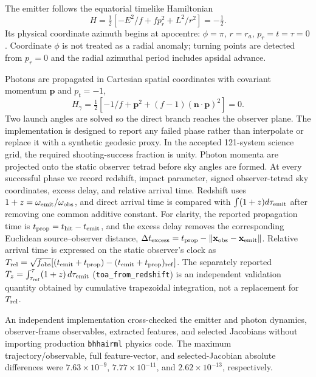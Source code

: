 \documentclass[11pt]{article}
\begin{document}
The emitter follows the equatorial timelike Hamiltonian
\begin{equation}
 H=\tfrac12[-E^2/f+fp_r^2+L^2/r^2]=-\tfrac12.
\end{equation}
Its physical coordinate azimuth begins at apocentre:
$\phi=\pi$, $r=r_a$, $p_r=t=\tau=0$. Coordinate $\phi$ is not treated as a
radial anomaly; turning points are detected from $p_r=0$ and the radial
azimuthal period includes apsidal advance.

Photons are propagated in Cartesian spatial coordinates with covariant momentum
$\mathbf p$ and $p_t=-1$,
\begin{equation}
 H_\gamma=\tfrac12[-1/f+\mathbf p^2+(f-1)(\mathbf n\!\cdot\!\mathbf p)^2]=0.
\end{equation}
Two launch angles are solved so the direct branch reaches the observer plane.
The implementation is designed to report any failed phase rather than
interpolate or replace it with a synthetic geodesic proxy. In the accepted
121-system science grid, the required shooting-success fraction is unity.
Photon momenta are projected onto the
static observer tetrad before sky angles are formed. At every successful phase
we record redshift, impact parameter, signed
observer-tetrad sky coordinates, excess delay, and relative arrival time.
Redshift uses
$1+z=\omega_{\rm emit}/\omega_{\rm obs}$, and direct arrival time is compared
with $\int(1+z)d\tau_{\rm emit}$ after removing one common additive constant.
For clarity, the reported propagation time is
$t_{\rm prop}=t_{\rm hit}-t_{\rm emit}$, and the excess delay removes the
corresponding Euclidean source--observer distance,
$\Delta t_{\rm excess}=t_{\rm prop}-\lVert\mathbf{x}_{\rm obs}-
\mathbf{x}_{\rm emit}\rVert$.  Relative arrival time is expressed on the
static observer's clock as
$T_{\rm rel}=\sqrt{f_{\rm obs}}[(t_{\rm emit}+t_{\rm prop})-
(t_{\rm emit}+t_{\rm prop})_{\rm ref}]$.  The separately reported
$T_z=\int_{\tau_{\rm ref}}^{\tau}(1+z)\,d\tau_{\rm emit}$
(\texttt{toa\_from\_redshift}) is an independent validation quantity obtained
by cumulative trapezoidal integration, not a replacement for $T_{\rm rel}$.

An independent implementation cross-checked the emitter and photon dynamics,
observer-frame observables, extracted features, and selected Jacobians without
importing production \texttt{bhhairml} physics code. The maximum
trajectory/observable, full feature-vector, and selected-Jacobian absolute
differences were $7.63\times10^{-9}$, $7.77\times10^{-11}$, and
$2.62\times10^{-13}$, respectively.
\end{document}
